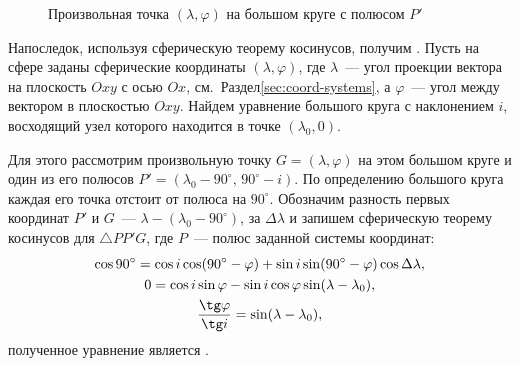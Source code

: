 \begin{wrapfigure}[11]{r}{0.42\tw}
    \caption{Произвольная точка $(\lambda, \varphi)$ на большом круге с полюсом $P'$}
    \label{pic:grand-circle}
\end{wrapfigure}
Напоследок, используя сферическую теорему косинусов, получим . Пусть на сфере заданы сферические координаты $(\lambda, \varphi)$, где $\lambda$~--- угол проекции вектора на плоскость $Oxy$ с осью $Ox$, см.~Раздел\;\ref{sec:coord-systems}, а $\varphi$~--- угол между вектором в плоскостью $Oxy$. Найдем уравнение большого круга с наклонением $i$, восходящий узел которого находится в точке $(\lambda_0, 0)$.

Для этого рассмотрим произвольную точку $G = (\lambda, \varphi)$ на этом большом круге и один из его полюсов $P' = (\lambda_0 - 90^\circ,\,90^\circ - i)$. По определению большого круга каждая его точка отстоит от полюса на $90^\circ$. Обозначим разность первых координат $P'$ и $G$~--- $\lambda - (\lambda_0 - 90^\circ)$, за $\Delta \lambda$ и запишем сферическую теорему косинусов для $\triangle PP'G$, где $P$~--- полюс заданной системы координат:
\begin{gather}
    \cos 90^\circ = \cos i \cos (90^\circ - \varphi) + \sin i \sin (90^\circ - \varphi) \cos \Delta \lambda,\nonumber \\
    0 = \cos i \sin \varphi - \sin i \cos \varphi \sin (\lambda - \lambda_0),\nonumber\\
    \frac{\tg \varphi}{\tg i} = \sin (\lambda - \lambda_0),
    \label{eq:great-circle-eq}
\end{gather}
полученное уравнение является .
